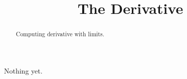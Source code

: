 \documentclass{ximera}
\title{The Derivative}
\begin{document}
\begin{abstract}
Computing derivative with limits.
\end{abstract}
\maketitle
  


Nothing yet.
\end{document}
